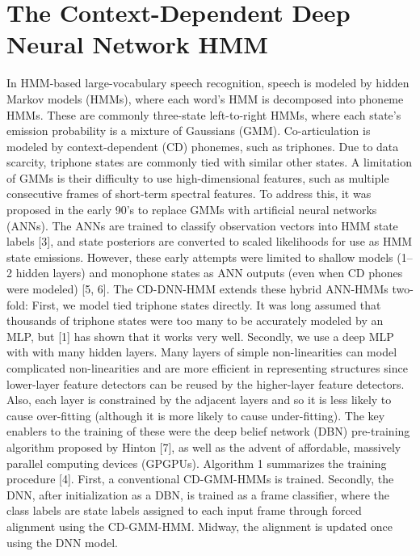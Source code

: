 \documentclass{article}
\begin{document}
\section{The Context-Dependent Deep
Neural Network HMM}
In HMM-based large-vocabulary speech recognition,
speech is modeled by hidden Markov models (HMMs),
where each word’s HMM is decomposed into phoneme
HMMs. These are commonly three-state left-to-right
HMMs, where each state’s emission probability is a
mixture of Gaussians (GMM). Co-articulation is modeled by context-dependent (CD) phonemes, such as
triphones. Due to data scarcity, triphone states are
commonly tied with similar other states.
A limitation of GMMs is their difficulty to use high-dimensional features, such as multiple consecutive
frames of short-term spectral features. To address this,
it was proposed in the early 90’s to replace GMMs
with artificial neural networks (ANNs). The ANNs are
trained to classify observation vectors into HMM state
labels [3], and state posteriors are converted to scaled
likelihoods for use as HMM state emissions. However,
these early attempts were limited to shallow models
(1–2 hidden layers) and monophone states as ANN
outputs (even when CD phones were modeled) [5, 6].
The CD-DNN-HMM extends these hybrid ANN-HMMs two-fold: First, we model tied triphone states
directly. It was long assumed that thousands of triphone states were too many to be accurately modeled
by an MLP, but [1] has shown that it works very well.
Secondly, we use a deep MLP with with many hidden layers. Many layers of simple non-linearities can 
model complicated non-linearities and are more efficient in representing structures since lower-layer feature detectors can be reused by the higher-layer feature
detectors. Also, each layer is constrained by the adjacent layers and so it is less likely to cause over-fitting
(although it is more likely to cause under-fitting).
The key enablers to the training of these were the deep
belief network (DBN) pre-training algorithm proposed
by Hinton [7], as well as the advent of affordable, massively parallel computing devices (GPGPUs). Algorithm 1 summarizes the training procedure [4]. First,
a conventional CD-GMM-HMMs is trained. Secondly,
the DNN, after initialization as a DBN, is trained as a
frame classifier, where the class labels are state labels
assigned to each input frame through forced alignment
using the CD-GMM-HMM. Midway, the alignment is
updated once using the DNN model.

\onecolumn
\end{document}
